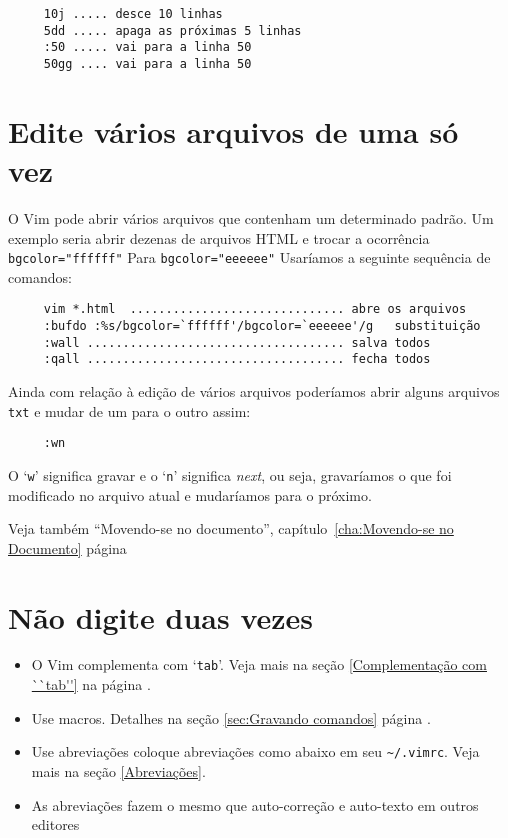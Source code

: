 \begin{verbatim}
     10j ..... desce 10 linhas
     5dd ..... apaga as próximas 5 linhas
     :50 ..... vai para a linha 50
     50gg .... vai para a linha 50
\end{verbatim}


\section{Edite vários arquivos de uma só vez }
\label{Edite vários arquivos de uma só vez }

O Vim pode abrir vários arquivos que contenham um determinado padrão.
Um exemplo seria abrir dezenas de arquivos HTML e trocar a ocorrência
\verb+bgcolor="ffffff"+ Para \verb+bgcolor="eeeeee"+ Usaríamos a seguinte 
sequência de comandos:

\begin{verbatim}
     vim *.html  .............................. abre os arquivos
     :bufdo :%s/bgcolor=`ffffff'/bgcolor=`eeeeee'/g   substituição
     :wall .................................... salva todos
     :qall .................................... fecha todos
\end{verbatim}

Ainda com relação à edição de vários arquivos poderíamos abrir alguns
arquivos {\tt txt} e mudar de um para o outro assim:

\begin{verbatim}
     :wn
\end{verbatim}

O `{\tt w}' significa gravar e o `{\tt n}' significa {\em next}, ou seja,
gravaríamos o que foi modificado no arquivo atual e mudaríamos para o próximo.

{\Large {}} Veja também ``Movendo-se no documento'', capítulo~\ref{cha:Movendo-se no Documento} página~\pageref{cha:Movendo-se no Documento}

\section{Não digite duas vezes}
\label{Não digite duas vezes}

\begin{itemize}
\item O Vim complementa com `{\tt tab}'. Veja mais na seção \ref{Complementação com ``tab''} na página \pageref{Complementação com ``tab''}.
\item Use macros. Detalhes na seção \ref{sec:Gravando comandos}
página \pageref{sec:Gravando comandos}.
\item Use abreviações coloque abreviações como abaixo em seu \verb|~/.vimrc|. Veja mais na seção \ref{Abreviações}.
\item As abreviações fazem o mesmo que auto-correção e auto-texto em outros editores
\end{itemize}

